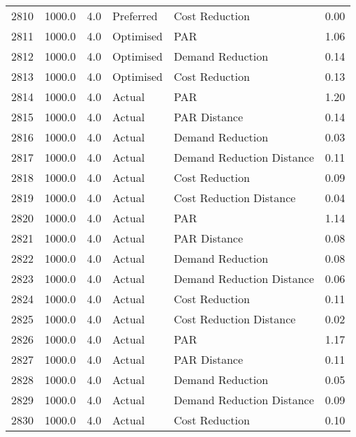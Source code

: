 \begin{longtable}{lrrllr}
2810 &       1000.0 &     4.0 &      Preferred &             Cost Reduction &   0.00 \\
2811 &       1000.0 &     4.0 &      Optimised &                        PAR &   1.06 \\
2812 &       1000.0 &     4.0 &      Optimised &           Demand Reduction &   0.14 \\
2813 &       1000.0 &     4.0 &      Optimised &             Cost Reduction &   0.13 \\
2814 &       1000.0 &     4.0 &         Actual &                        PAR &   1.20 \\
2815 &       1000.0 &     4.0 &         Actual &               PAR Distance &   0.14 \\
2816 &       1000.0 &     4.0 &         Actual &           Demand Reduction &   0.03 \\
2817 &       1000.0 &     4.0 &         Actual &  Demand Reduction Distance &   0.11 \\
2818 &       1000.0 &     4.0 &         Actual &             Cost Reduction &   0.09 \\
2819 &       1000.0 &     4.0 &         Actual &    Cost Reduction Distance &   0.04 \\
2820 &       1000.0 &     4.0 &         Actual &                        PAR &   1.14 \\
2821 &       1000.0 &     4.0 &         Actual &               PAR Distance &   0.08 \\
2822 &       1000.0 &     4.0 &         Actual &           Demand Reduction &   0.08 \\
2823 &       1000.0 &     4.0 &         Actual &  Demand Reduction Distance &   0.06 \\
2824 &       1000.0 &     4.0 &         Actual &             Cost Reduction &   0.11 \\
2825 &       1000.0 &     4.0 &         Actual &    Cost Reduction Distance &   0.02 \\
2826 &       1000.0 &     4.0 &         Actual &                        PAR &   1.17 \\
2827 &       1000.0 &     4.0 &         Actual &               PAR Distance &   0.11 \\
2828 &       1000.0 &     4.0 &         Actual &           Demand Reduction &   0.05 \\
2829 &       1000.0 &     4.0 &         Actual &  Demand Reduction Distance &   0.09 \\
2830 &       1000.0 &     4.0 &         Actual &             Cost Reduction &   0.10 \\

\end{longtable}
